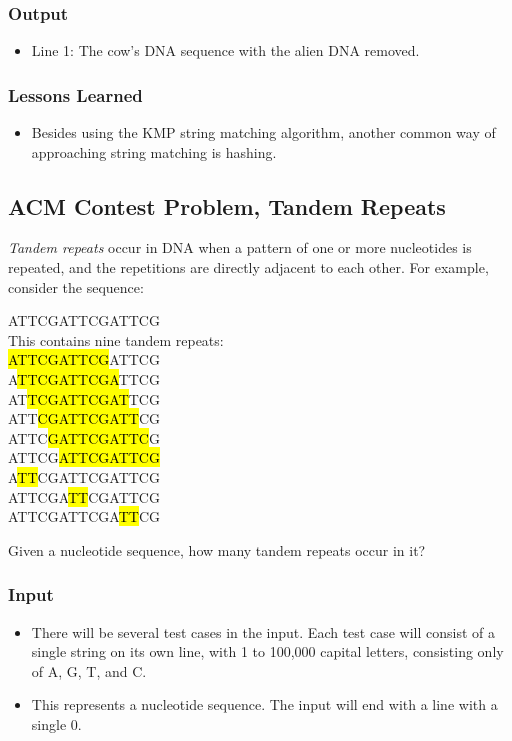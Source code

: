 \subsubsection{Output}
\begin{itemize}
\item Line 1: The cow's DNA sequence with the alien DNA removed.
\end{itemize}


\subsubsection{Lessons Learned}
\begin{itemize}
	\item Besides using the KMP string matching algorithm, another common way of approaching string matching is hashing.
\end{itemize}

\subsection{ACM Contest Problem, Tandem Repeats\cite{acmsoutheastregional2013}}
\textit{Tandem repeats} occur in DNA when a pattern of one or more nucleotides is repeated, and the repetitions are directly adjacent to each other.
For example, consider the sequence:
\begin{center}
	ATTCGATTCGATTCG\\
	This contains nine tandem repeats:\\
	\hl{ATTCGATTCG}ATTCG\\
	A\hl{TTCGATTCGA}TTCG\\
	AT\hl{TCGATTCGAT}TCG\\
	ATT\hl{CGATTCGATT}CG\\
	ATTC\hl{GATTCGATTC}G\\
	ATTCG\hl{ATTCGATTCG}\\
	A\hl{TT}CGATTCGATTCG\\
	ATTCGA\hl{TT}CGATTCG\\
	ATTCGATTCGA\hl{TT}CG\\
\end{center}

Given a nucleotide sequence, how many tandem repeats occur in it?

\subsubsection{Input}
\begin{itemize}
	\item There will be several test cases in the input.
	Each test case will consist of a single string on its own line, with 1 to 100,000 capital letters, consisting only of A, G, T, and C.
	\item This represents a nucleotide sequence.
	The input will end with a line with a single 0.
\end{itemize}


